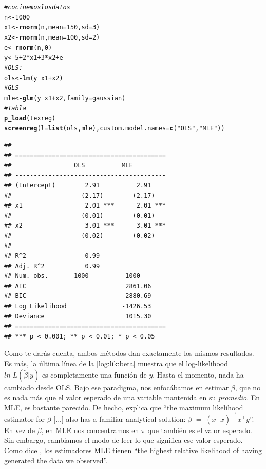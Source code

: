 \documentclass[onesided]{article}\usepackage[]{graphicx}\usepackage[]{color}
\makeatletter
\newcommand{\hlnum}[1]{\textcolor[rgb]{0.686,0.059,0.569}{#1}}%
\newcommand{\hlstr}[1]{\textcolor[rgb]{0.192,0.494,0.8}{#1}}%
\newcommand{\hlcom}[1]{\textcolor[rgb]{0.678,0.584,0.686}{\textit{#1}}}%
\newcommand{\hlopt}[1]{\textcolor[rgb]{0,0,0}{#1}}%
\newcommand{\hlstd}[1]{\textcolor[rgb]{0.345,0.345,0.345}{#1}}%
\newcommand{\hlkwb}[1]{\textcolor[rgb]{0.69,0.353,0.396}{#1}}%
\newcommand{\hlkwc}[1]{\textcolor[rgb]{0.333,0.667,0.333}{#1}}%
\newcommand{\hlkwd}[1]{\textcolor[rgb]{0.737,0.353,0.396}{\textbf{#1}}}%
\newenvironment{kframe}{%
 \def\at@end@of@kframe{}%
 \ifinner\ifhmode%
  \def\at@end@of@kframe{\end{minipage}}%
  \begin{minipage}{\columnwidth}%
 \fi\fi%
 \def\FrameCommand##1{\hskip\@totalleftmargin \hskip-\fboxsep
 \colorbox{shadecolor}{##1}\hskip-\fboxsep
     \hskip-\linewidth \hskip-\@totalleftmargin \hskip\columnwidth}%
 \MakeFramed {\advance\hsize-\width
   \@totalleftmargin\z@ \linewidth\hsize
   \@setminipage}}%
 {\par\unskip\endMakeFramed%
 \at@end@of@kframe}
\newenvironment{knitrout}{}{} %
\makeatother
\begin{document}
\begin{knitrout}
\color{fgcolor}\begin{kframe}
\begin{alltt}
\hlcom{# cocinemos los datos}
\hlstd{n} \hlkwb{<-} \hlnum{1000}
\hlstd{x1} \hlkwb{<-} \hlkwd{rnorm}\hlstd{(n,} \hlkwc{mean} \hlstd{=} \hlnum{150}\hlstd{,} \hlkwc{sd} \hlstd{=} \hlnum{3}\hlstd{)}
\hlstd{x2} \hlkwb{<-} \hlkwd{rnorm}\hlstd{(n,} \hlkwc{mean} \hlstd{=} \hlnum{100}\hlstd{,} \hlkwc{sd} \hlstd{=} \hlnum{2}\hlstd{)}
\hlstd{e}  \hlkwb{<-} \hlkwd{rnorm}\hlstd{(n,} \hlnum{0}\hlstd{)}
\hlstd{y}  \hlkwb{<-} \hlnum{5} \hlopt{+} \hlnum{2}\hlopt{*}\hlstd{x1} \hlopt{+} \hlnum{3}\hlopt{*}\hlstd{x2} \hlopt{+} \hlstd{e}
\hlcom{# OLS:}
\hlstd{ols} \hlkwb{<-} \hlkwd{lm}\hlstd{(y} \hlopt{~} \hlstd{x1} \hlopt{+} \hlstd{x2)}
\hlcom{# GLS}
\hlstd{mle} \hlkwb{<-} \hlkwd{glm}\hlstd{(y} \hlopt{~} \hlstd{x1} \hlopt{+} \hlstd{x2,} \hlkwc{family}\hlstd{=gaussian)}
\hlcom{# Tabla}
\hlkwd{p_load}\hlstd{(texreg)}
\hlkwd{screenreg}\hlstd{(}\hlkwc{l} \hlstd{=} \hlkwd{list}\hlstd{(ols, mle),} \hlkwc{custom.model.names}\hlstd{=}\hlkwd{c}\hlstd{(}\hlstr{"OLS"}\hlstd{,} \hlstr{"MLE"}\hlstd{))}
\end{alltt}
\begin{verbatim}
## 
## =========================================
##                 OLS          MLE         
## -----------------------------------------
## (Intercept)        2.91          2.91    
##                   (2.17)        (2.17)   
## x1                 2.01 ***      2.01 ***
##                   (0.01)        (0.01)   
## x2                 3.01 ***      3.01 ***
##                   (0.02)        (0.02)   
## -----------------------------------------
## R^2                0.99                  
## Adj. R^2           0.99                  
## Num. obs.       1000          1000       
## AIC                           2861.06    
## BIC                           2880.69    
## Log Likelihood               -1426.53    
## Deviance                      1015.30    
## =========================================
## *** p < 0.001; ** p < 0.01; * p < 0.05
\end{verbatim}
\end{kframe}
\end{knitrout}

Como te dar\'as cuenta, ambos m\'etodos dan exactamente los mismos resultados. Es m\'as, la \'ultima l\'inea de la \autoref{log:lik:beta} muestra que el log-likelihood $ln \; L(\tilde{\beta}|y)$ es completamente una funci\'on de $y$. Hasta el momento, nada ha cambiado desde OLS. Bajo ese paradigma, nos enfoc\'abamos en estimar $\beta$, que no es nada m\'as que el valor esperado de una variable mantenida en su \emph{promedio}. En MLE, es bastante parecido. De hecho, \textcite[68]{King1998} explica que ``the maximum likelihood estimator for $\beta$ [...] also has a familiar analytical solution: $\beta \;=\; (x^{\top}x)^{-1}x^{\top}y$''. En vez de $\beta$, en MLE nos concentramos en $\pi$ que tambi\'en es el valor esperado. Sin embargo, cambiamos el modo de leer lo que significa ese valor esperado. Como dice \textcite[66-67]{King1998}, los estimadores MLE tienen ``the highest relative likelihood of having generated the data we observed''.
\end{document}
